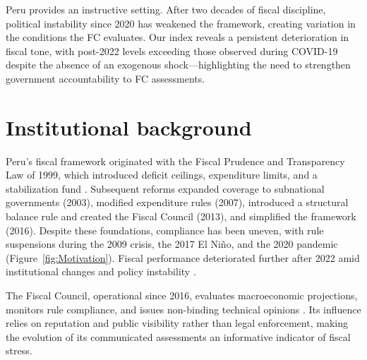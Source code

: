 \documentclass[a4paper, fleqn, 12pt]{article}
\begin{document}
Peru provides an instructive setting. After two decades of fiscal discipline, political instability since 2020 has weakened the framework, creating variation in the conditions the FC evaluates. Our index reveals a persistent deterioration in fiscal tone, with post-2022 levels exceeding those observed during COVID-19 despite the absence of an exogenous shock—highlighting the need to strengthen government accountability to FC assessments.


\section{Institutional background}

Peru’s fiscal framework originated with the Fiscal Prudence and Transparency Law of 1999, which introduced deficit ceilings, expenditure limits, and a stabilization fund \citep{Valderrama2022, Montoya2024}. Subsequent reforms expanded coverage to subnational governments (2003), modified expenditure rules (2007), introduced a structural balance rule and created the Fiscal Council (2013), and simplified the framework (2016). Despite these foundations, compliance has been uneven, with rule suspensions during the 2009 crisis, the 2017 El Ni\~{n}o, and the 2020 pandemic (Figure~\ref{fig:Motivation}). Fiscal performance deteriorated further after 2022 amid institutional changes and policy instability \citep{SchmidtHebbel2022}.

The Fiscal Council, operational since 2016, evaluates macroeconomic projections, monitors rule compliance, and issues non-binding technical opinions \citep{CespedesHuarcaRamirez2016}. Its influence relies on reputation and public visibility rather than legal enforcement, making the evolution of its communicated assessments an informative indicator of fiscal stress.

\end{document}

